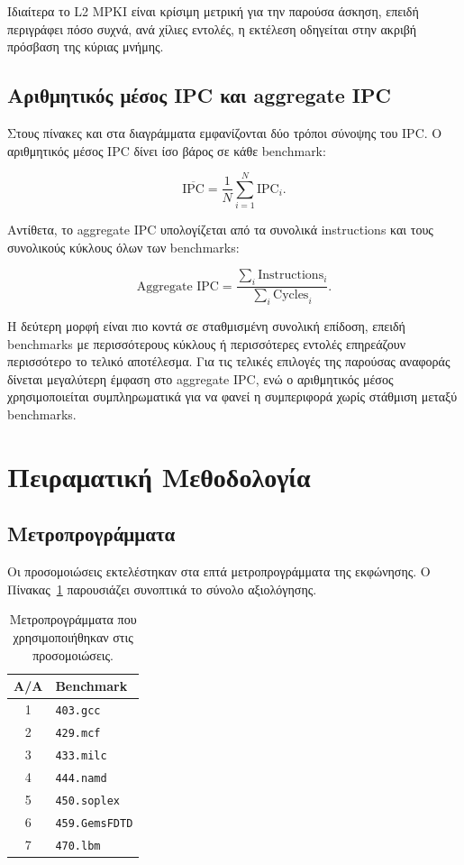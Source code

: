 \documentclass{article}
\begin{document}
Ιδιαίτερα το L2 MPKI είναι κρίσιμη μετρική για την παρούσα άσκηση, επειδή περιγράφει πόσο συχνά, ανά χίλιες εντολές, η εκτέλεση οδηγείται στην ακριβή πρόσβαση της κύριας μνήμης.

\subsection{Αριθμητικός μέσος IPC και aggregate IPC}

Στους πίνακες και στα διαγράμματα εμφανίζονται δύο τρόποι σύνοψης του IPC. Ο αριθμητικός μέσος IPC δίνει ίσο βάρος σε κάθε benchmark:

\[
\overline{\text{IPC}} = \frac{1}{N}\sum_{i=1}^{N}\text{IPC}_i.
\]

Αντίθετα, το \textlatin{aggregate IPC} υπολογίζεται από τα συνολικά instructions και τους συνολικούς κύκλους όλων των benchmarks:

\[
\text{Aggregate IPC} =
\frac{\sum_i \text{Instructions}_i}{\sum_i \text{Cycles}_i}.
\]

Η δεύτερη μορφή είναι πιο κοντά σε σταθμισμένη συνολική επίδοση, επειδή benchmarks με περισσότερους κύκλους ή περισσότερες εντολές επηρεάζουν περισσότερο το τελικό αποτέλεσμα. Για τις τελικές επιλογές της παρούσας αναφοράς δίνεται μεγαλύτερη έμφαση στο aggregate IPC, ενώ ο αριθμητικός μέσος χρησιμοποιείται συμπληρωματικά για να φανεί η συμπεριφορά χωρίς στάθμιση μεταξύ benchmarks.

\section{Πειραματική Μεθοδολογία}

\subsection{Μετροπρογράμματα}

Οι προσομοιώσεις εκτελέστηκαν στα επτά μετροπρογράμματα της εκφώνησης. Ο Πίνακας~\ref{tab:benchmarks} παρουσιάζει συνοπτικά το σύνολο αξιολόγησης.

\begin{table}[htbp]
\centering
\caption{Μετροπρογράμματα που χρησιμοποιήθηκαν στις προσομοιώσεις.}
\label{tab:benchmarks}
\begin{tabular}{cl}
\toprule
\textbf{Α/Α} & \textbf{Benchmark} \\
\midrule
1 & \texttt{403.gcc} \\
2 & \texttt{429.mcf} \\
3 & \texttt{433.milc} \\
4 & \texttt{444.namd} \\
5 & \texttt{450.soplex} \\
6 & \texttt{459.GemsFDTD} \\
7 & \texttt{470.lbm} \\
\bottomrule
\end{tabular}
\end{table}
\end{document}
